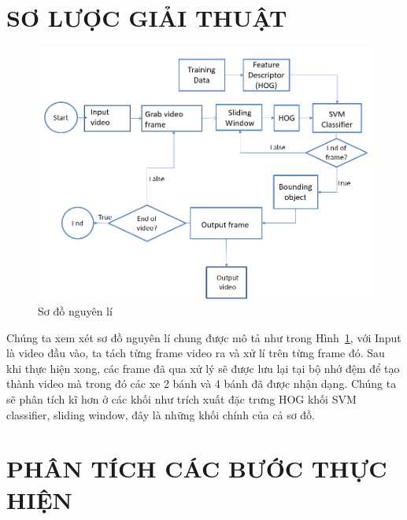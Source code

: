 \documentclass[10pt,conference,a4paper]{IEEEtran}
\makeatletter
\def\ScaleIfNeeded{\ifdim\Gin@nat@width>\linewidth\linewidth\else\Gin@nat@width\fi}
\makeatother
\begin{document}
\section{SƠ LƯỢC GIẢI THUẬT}
\label{Sec:soluocgiaithuat}
\begin{figure}[ht]
	\centering
	\includegraphics[width=\ScaleIfNeeded]{scheme2}
	\caption{Sơ đồ nguyên lí}
	\label{fig:scheme2}
\end{figure}





Chúng ta xem xét sơ đồ nguyên lí chung được mô tả như trong Hình~\ref{fig:scheme2}, với Input là video đầu vào, ta tách từng frame video ra và xử lí trên từng frame đó. Sau khi thực hiện xong, các frame đã qua xử lý sẽ được lưu lại tại bộ nhớ đệm để tạo thành video mà trong đó các xe 2 bánh và 4 bánh đã được nhận dạng.
Chúng ta sẽ phân tích kĩ hơn ở các khối như trích xuất đặc trưng HOG khối SVM classifier, sliding window, đây là những khối chính của cả sơ đồ. 

	





\section{PHÂN TÍCH CÁC BƯỚC THỰC HIỆN}
\label{Sec:Cacbuocthuchien}
%
\end{document}
